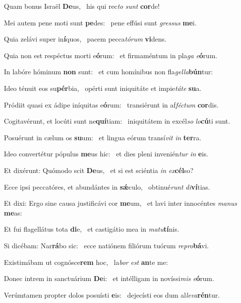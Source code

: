\item Quam bonus Israël \textbf{De}us,~\psstar{} his qui rec\textit{to} \textit{sunt} \textbf{cor}de!
\item Mei autem pene moti sunt \textbf{pe}des:~\psstar{} pene effúsi sunt \textit{gressus} \textbf{me}i.
\item Quia zelávi super in\textbf{í}quos,~\psstar{} pacem pecca\textit{tórum} \textbf{vi}dens.
\item Quia non est respéctus morti e\textbf{ó}rum:~\psstar{} et firmaméntum in pla\textit{ga} \textit{e}\textbf{ó}rum.
\item In labóre hóminum \textbf{non} sunt:~\psstar{} et cum homínibus non fla\textit{gella}\textbf{bún}tur:
\item Ideo ténuit eos su\textbf{pér}bia,~\psstar{} opérti sunt iniquitáte et impie\textit{táte} \textbf{su}a.
\item Pródiit quasi ex ádipe iníquitas e\textbf{ó}rum:~\psstar{} transiérunt in af\textit{féctum} \textbf{cor}dis.
\item Cogitavérunt, et locúti sunt ne\textbf{quí}tiam:~\psstar{} iniquitátem in excél\textit{so} \textit{lo}\textbf{cú}ti sunt.
\item Posuérunt in cælum os \textbf{su}um:~\psstar{} et lingua eórum transí\textit{vit} \textit{in} \textbf{ter}ra.
\item Ideo convertétur pópulus \textbf{me}us hic:~\psstar{} et dies pleni invenién\textit{tur} \textit{in} \textbf{e}is.
\item Et dixérunt: Quómodo scit \textbf{De}us,~\psstar{} et si est sciéntia \textit{in} \textit{ex}\textbf{cél}so?
\item Ecce ipsi peccatóres, et abundántes in \textbf{sǽ}culo,~\psstar{} obtinué\textit{runt} \textit{di}\textbf{ví}tias.
\item Et dixi: Ergo sine causa justificávi cor \textbf{me}um,~\psstar{} et lavi inter innocéntes \textit{manus} \textbf{me}as:
\item Et fui flagellátus tota \textbf{di}e,~\psstar{} et castigátio mea in \textit{matu}\textbf{tí}nis.
\item Si dicébam: Nar\textbf{rá}bo sic:~\psstar{} ecce natiónem filiórum tuórum \textit{repro}\textbf{bá}vi.
\item Existimábam ut cognósce\textbf{rem} hoc,~\psstar{} la\textit{bor} \textit{est} \textbf{an}te me:
\item Donec intrem in sanctuárium \textbf{De}i:~\psstar{} et intélligam in novíssi\textit{mis} \textit{e}\textbf{ó}rum.
\item Verúmtamen propter dolos posuísti \textbf{e}is:~\psstar{} dejecísti eos dum al\textit{leva}\textbf{rén}tur.
